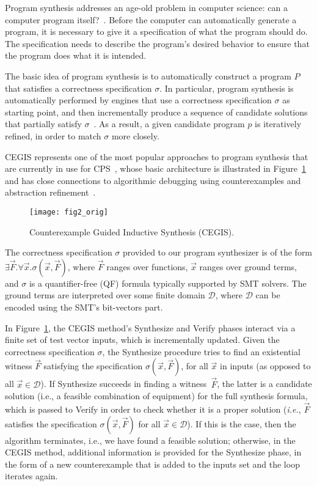 Program synthesis addresses an age-old problem in computer science: can a computer program itself?~\cite{Bornholt2019}. Before the computer can automatically generate a program, it is necessary to give it a specification of what the program should do. The specification needs to describe the program's desired behavior to ensure that the program does what it is intended.

The basic idea of program synthesis is to automatically construct a program $P$ that satisfies a correctness specification $\sigma$. In particular, program synthesis is automatically performed by engines that use a correctness specification $\sigma$ as starting point, and then incrementally produce a sequence of candidate solutions that partially satisfy $\sigma$~\cite{Abateetal2017}. As a result, a given candidate program $p$ is iteratively refined, in order to match $\sigma$ more closely. 

CEGIS represents one of the most popular approaches to program synthesis that are currently in use for CPS~\cite{Abateetal2017}, whose basic architecture is illustrated in Figure~\ref{Counter-Example-Guided-Inductive-Synthesis} and has close connections to algorithmic debugging using counterexamples and abstraction refinement~\cite{Alur}. 

\begin{figure}[h]
	\centering
	\texttt{[image: fig2\_orig]}
	\caption{Counterexample Guided Inductive Synthesis (CEGIS).}
	\label{Counter-Example-Guided-Inductive-Synthesis}
\end{figure}

The correctness specification $\sigma$ provided to our program synthesizer is of the form $\exists \vec{F} .  \forall \vec{x}.  \sigma(\vec{x}, \vec{F})$, where $\vec{F}$ ranges over functions, $\vec{x}$ ranges over ground terms, and $\sigma$ is a quantifier-free (QF) formula typically supported by SMT solvers. The ground terms are interpreted over some finite domain $\mathcal{D}$, where $\mathcal{D}$ can be encoded using the SMT's bit-vectors part. 

In Figure~\ref{Counter-Example-Guided-Inductive-Synthesis}, the  CEGIS method's {\sc Synthesize} and {\sc Verify} phases interact via a finite set of test vector {\sc inputs}, which is incrementally updated. Given the correctness specification $\sigma$, the {\sc Synthesize} procedure tries to find an existential witness $\vec{F}$ satisfying the specification $\sigma(\vec{x}, \vec{F})$, for all $\vec{x}$ in {\sc inputs} (as opposed to all $\vec{x} \in \mathcal{D}$). If {\sc Synthesize} succeeds in finding a witness~$\vec{F}$, the latter is a candidate solution (i.e., a feasible combination of equipment) for the full synthesis formula, which is passed to {\sc Verify} in order to check whether it is a proper solution ({\it i.e.}, $\vec{F}$ satisfies the specification $\sigma(\vec{x}, \vec{F})$ for all $\vec{x}\in\mathcal{D}$). If this is the case, then the algorithm terminates, i.e., we have found a feasible solution; otherwise, in the CEGIS method, additional information is provided for the {\sc Synthesize} phase, in the form of a new counterexample that is added to the {\sc inputs} set and the loop iterates again.

